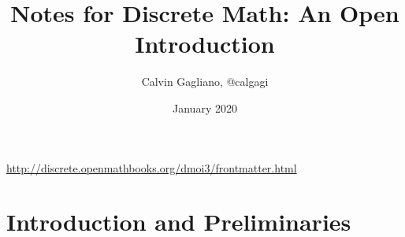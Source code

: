 \documentclass{article}
\title{Notes for Discrete Math: An Open Introduction}
\author{Calvin Gagliano, @calgagi}
\date{January 2020}
\begin{document}
\maketitle

\url{http://discrete.openmathbooks.org/dmoi3/frontmatter.html}

\tableofcontents


\section{Introduction and Preliminaries}




        

\end{document}
